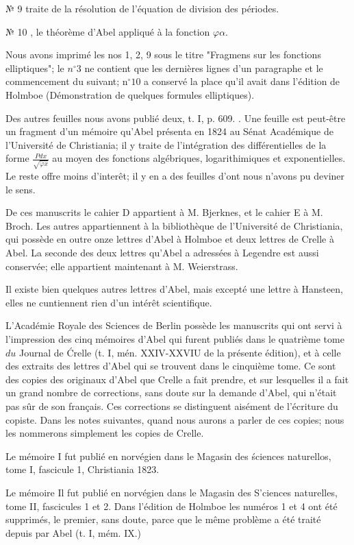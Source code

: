 \documentclass{article}
\begin{document}
№ 9 traite de la résolution de l'équation de division des périodes.

№ 10 , le théorème d'Abel appliqué à la fonction \(\varphi \alpha\).

Nous avons imprimé les nos 1, 2, 9 sous le titre "Fragmens sur les fonctions elliptiques"; le \(n^{\circ} 3\) ne contient que les dernières lignes d'un paragraphe et le commencement du suivant; \(\mathrm{n}^{\circ} 10\) a conservé la place qu'il avait dans l'édition de Holmboe (Démonstration de quelques formules elliptiques).

Des autres feuilles nous avons publié deux, t. I, p. 609. . Une feuille est peut-être un fragment d'un mémoire qu'Abel présenta en 1824 au Sénat Académique de l'Université de Christiania; il y traite de l'intégration des différentielles de la forme \(\frac{P d x}{\sqrt{\dot{\varphi} x}}\) au moyen des fonctions algébriques, logarithimiques et exponentielles. Le reste offre moins d'interêt; il y en a des feuilles d'ont nous n'avons pu deviner le sens.

De ces manuscrits le cahier D appartient à M. Bjerknes, et le cahier E à M. Broch. Les autres appartiennent à la bibliothèque de l'Université de Christiania, qui possède en outre onze lettres d'Abel à Holmboe et deux lettres de Crelle à Abel. La seconde des
deux lettres qu'Abel a adressées à Legendre est aussi conservée; elle appartient maintenant à M. Weierstrass.

Il existe bien quelques autres lettres d'Abel, mais excepté une lettre à Hansteen, elles ne cuntiennent rien d'un intérêt scientifique.

L'Académie Royale des Sciences de Berlin possède les manuscrits qui ont servi à l'impression des cinq mémoires d'Abel qui furent publiés dans le quatrième tome \(d u\) Journal de Ćrelle (t. I, mén. XXIV-XXVIU de la présente édition), et à celle des extraits des lettres d'Abel qui se trouvent dans le cinquième tome. Ce sont des copies des originaux d'Abel que Crelle a fait prendre, et sur lesquelles il a fait un grand nombre de corrections, sans doute sur la demande d'Abel, qui n'était pas sûr de son français. Ces corrections se distinguent aisément de l'écriture du copiste. Dans les notes suivantes, quand nous aurons a parler de ces copies; nous les nommerons simplement les copies de Crelle.

Le mémoire I fut publié en norvégien dans le Magasin des ściences naturellos, tome I, fascicule 1, Christiania 1823.

Le mémoire Il fut publié en norvégien dans le Magasin des S'ciences naturelles, tome II, fascicules 1 et 2. Dans l'édition de Holmboe les numéros 1 et 4 ont été supprimés, le premier, sans doute, parce que le même problème a été traité depuis par Abel (t. I, mém. IX.)
\end{document}
